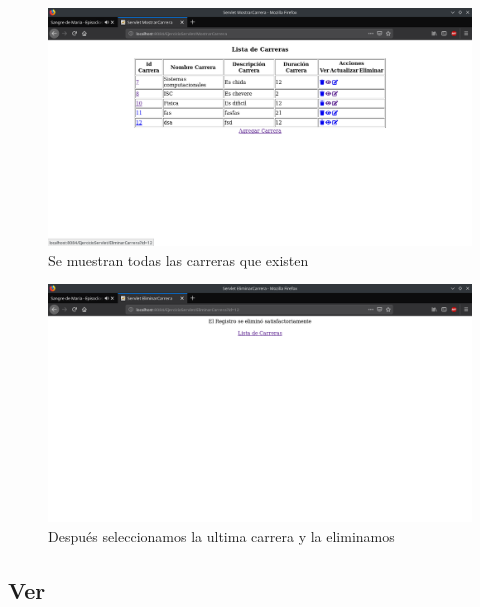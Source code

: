 \documentclass[a4paper,12pt]{article}
\begin{document}
\begin{figure}[H]
\begin{center}
 \includegraphics[width=\textwidth]{img/baja1.png}
 \caption{Se muestran todas las carreras que existen}
 \label{fig:baja1}
\end{center}
\end{figure}

\begin{figure}[H]
\begin{center}
 \includegraphics[width=\textwidth]{img/baja2.png}
 \caption{Después seleccionamos la ultima carrera y la eliminamos}
 \label{fig:baja2}
\end{center}
\end{figure}

\subsection{Ver}
\end{document}

